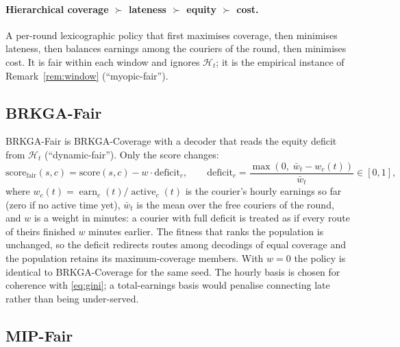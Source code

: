 \documentclass[preprint,12pt,authoryear]{elsarticle}%
\newcommand{\Hist}{\mathcal{H}}
\DeclareMathOperator{\earn}{earn}
\DeclareMathOperator{\act}{active}
\begin{document}
\paragraph{Hierarchical coverage $\succ$ lateness $\succ$ equity $\succ$ cost.} A per-round lexicographic policy that first maximises coverage, then minimises lateness, then balances earnings among the couriers of the round, then minimises cost. It is fair within each window and ignores $\Hist_t$; it is the empirical instance of Remark~\ref{rem:window} (``myopic-fair'').

\subsection{BRKGA-Fair}
\label{sec:brkgafair}

BRKGA-Fair is BRKGA-Coverage with a decoder that reads the equity deficit from $\Hist_t$ (``dynamic-fair''). Only the score changes:
\begin{equation}
\text{score}_{\text{fair}}(s, c) = \text{score}(s, c) - w \cdot \text{deficit}_c, \qquad
\text{deficit}_c = \frac{\max(0,\; \bar w_t - w_c(t))}{\bar w_t} \in [0,1],
\label{eq:brkgafair}
\end{equation}
where $w_c(t) = \earn_c(t)/\act_c(t)$ is the courier's hourly earnings so far (zero if no active time yet), $\bar w_t$ is the mean over the free couriers of the round, and $w$ is a weight in minutes: a courier with full deficit is treated as if every route of theirs finished $w$ minutes earlier. The fitness that ranks the population is unchanged, so the deficit redirects routes among decodings of equal coverage and the population retains its maximum-coverage members. With $w = 0$ the policy is identical to BRKGA-Coverage for the same seed. The hourly basis is chosen for coherence with \eqref{eq:gini}; a total-earnings basis would penalise connecting late rather than being under-served.

\subsection{MIP-Fair}
\label{sec:mipfair}
\end{document}
